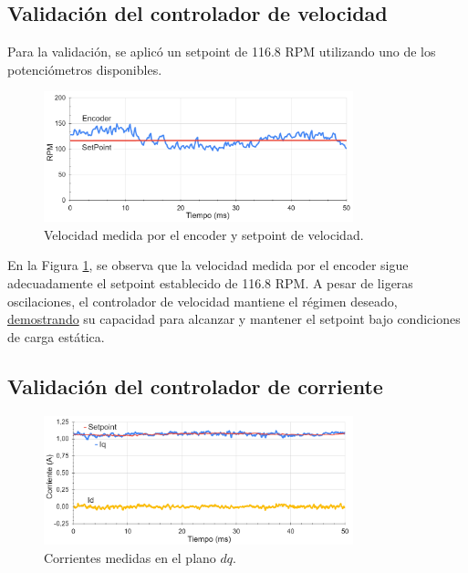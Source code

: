 \documentclass[11pt]{report}
\begin{document}
\subsection{Validación del controlador de velocidad}
Para la validación, se aplicó un setpoint de 116.8 RPM utilizando uno de los potenciómetros disponibles.

\begin{figure}[ht]
	\centering
	\includegraphics[width=0.8\textwidth]{imagenes/graficas/CV.png}
	\caption{Velocidad medida por el encoder y setpoint de velocidad.}
	\label{velocidad_encoder}
\end{figure}
\FloatBarrier

En la Figura \ref{velocidad_encoder}, se observa que la velocidad medida por el encoder sigue adecuadamente el setpoint establecido de 116.8 RPM. A pesar de ligeras oscilaciones, el controlador de velocidad mantiene el régimen deseado, \href{https://www.youtube.com/watch?v=B8VR5mQcgjI}{demostrando} su capacidad para alcanzar y mantener el setpoint bajo condiciones de carga estática.

\newpage
\subsection{Validación del controlador de corriente}

\begin{figure}[ht]
	\centering
	\includegraphics[width=0.8\textwidth]{imagenes/graficas/CV_CC.png}
	\caption{Corrientes medidas en el plano $dq$.}
	\label{cont_corrientes_dq}
\end{figure}
\FloatBarrier
\end{document}
